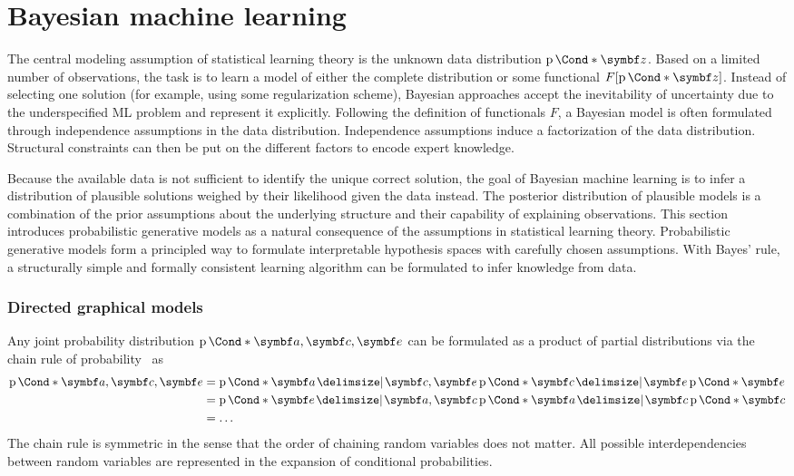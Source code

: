 \section{Bayesian machine learning}
\label{toc:bayesian_ml:bayesian_ml}
The central modeling assumption of statistical learning theory is the unknown data distribution $\Prob*{\mat{z}}$.
Based on a limited number of observations, the task is to learn a model of either the complete distribution or some functional $F[\Prob*{\mat{z}}]$.
Instead of selecting one solution (for example, using some regularization scheme), Bayesian approaches accept the inevitability of uncertainty due to the underspecified ML problem and represent it explicitly.
Following the definition of functionals $F$, a Bayesian model is often formulated through independence assumptions in the data distribution.
Independence assumptions induce a factorization of the data distribution.
Structural constraints can then be put on the different factors to encode expert knowledge.

Because the available data is not sufficient to identify the unique correct solution, the goal of Bayesian machine learning is to infer a distribution of plausible solutions weighed by their likelihood given the data instead.
The posterior distribution of plausible models is a combination of the prior assumptions about the underlying structure and their capability of explaining observations.
This section introduces probabilistic generative models as a natural consequence of the assumptions in statistical learning theory.
Probabilistic generative models form a principled way to formulate interpretable hypothesis spaces with carefully chosen assumptions.
With Bayes' rule, a structurally simple and formally consistent learning algorithm can be formulated to infer knowledge from data.

\subsubsection{Directed graphical models}
Any joint probability distribution $\Prob*{\mat{a}, \mat{c}, \mat{e}}$ can be formulated as a product of partial distributions via the chain rule of probability~\parencite{murphy_machine_2012} as
\begin{equation}
    \begin{split}
        \Prob*{\mat{a}, \mat{c}, \mat{e}}
        &= \Prob*{\mat{a} \given \mat{c}, \mat{e}}\Prob*{\mat{c} \given \mat{e}}\Prob*{\mat{e}} \\
        &= \Prob*{\mat{e} \given \mat{a}, \mat{c}}\Prob*{\mat{a} \given \mat{c}}\Prob*{\mat{c}} \\
        &= \dots
    \end{split}
\end{equation}
The chain rule is symmetric in the sense that the order of chaining random variables does not matter.
All possible interdependencies between random variables are represented in the expansion of conditional probabilities.

